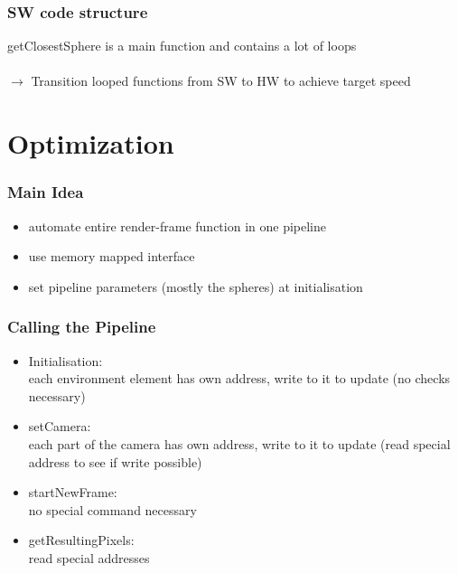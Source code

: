 \documentclass{beamer}
\begin{document}
\begin{frame} %
	\frametitle{SW code structure} %
	getClosestSphere is a main function and contains a lot of loops\\
	$\quad$\\
	$\rightarrow$ Transition looped functions from SW to HW to achieve target speed
\end{frame}

\section{Optimization}


\begin{frame} %
	\frametitle{Main Idea}
	\begin{itemize}
	\item automate entire render-frame function in one pipeline
	\item use memory mapped interface
	\item set pipeline parameters (mostly the spheres) at initialisation
	\end{itemize}
\end{frame}

\begin{frame} %
	\frametitle{Calling the Pipeline} %
	\begin{itemize}
		\item Initialisation:\\
		each environment element has own address, write to it to update (no checks necessary)
		\item setCamera:\\
		each part of the camera has own address, write to it to update (read special address to see if write possible)
		\item startNewFrame:\\
		no special command necessary
		\item getResultingPixels:\\
		read special addresses
	\end{itemize}
\end{frame}
\end{document}
